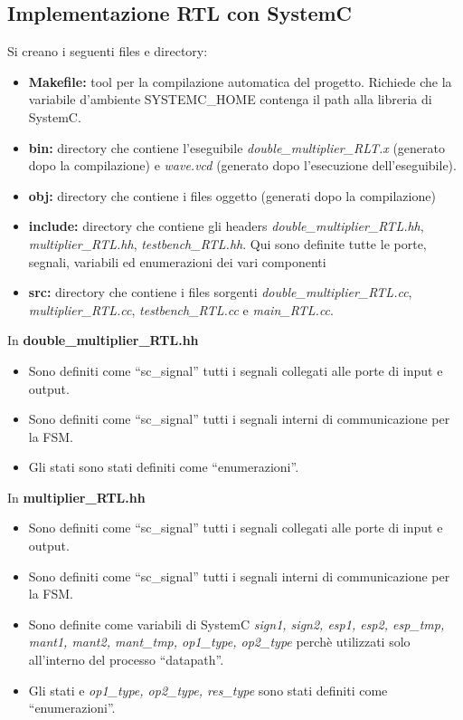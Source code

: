 \documentclass[]{IEEEtran}
\begin{document}
\subsection{Implementazione RTL con SystemC \label{section:SystemC}}
Si creano i seguenti files e directory:
\begin{itemize}
    \item \textbf{Makefile:} tool per la compilazione automatica del progetto. Richiede che la variabile d'ambiente SYSTEMC\_HOME contenga il path alla libreria di SystemC.
    \item \textbf{bin:} directory che contiene l'eseguibile \textit{double\_multiplier\_RLT.x} (generato dopo la compilazione) e \textit{wave.vcd} (generato dopo l'esecuzione dell'eseguibile).
    \item \textbf{obj:} directory che contiene i files oggetto (generati dopo la compilazione)
    \item \textbf{include:} directory che contiene gli headers \textit{double\_multiplier\_RTL.hh}, \textit{multiplier\_RTL.hh}, \textit{testbench\_RTL.hh}. Qui sono definite tutte le porte, segnali, variabili ed enumerazioni dei vari componenti
    \item \textbf{src:} directory che contiene i files sorgenti \textit{double\_multiplier\_RTL.cc}, \textit{multiplier\_RTL.cc}, \textit{testbench\_RTL.cc} e \textit{main\_RTL.cc}.
\end{itemize}
In \textbf{double\_multiplier\_RTL.hh}
\begin{itemize}
    \item Sono definiti come ``sc\_signal'' tutti i segnali collegati alle porte di input e output.
    \item Sono definiti come ``sc\_signal'' tutti i segnali interni di communicazione per la FSM.
    \item Gli stati sono stati definiti come ``enumerazioni''.
\end{itemize}
In \textbf{multiplier\_RTL.hh}
\begin{itemize}
    \item Sono definiti come ``sc\_signal'' tutti i segnali collegati alle porte di input e output.
    \item Sono definiti come ``sc\_signal'' tutti i segnali interni di communicazione per la FSM.
    \item Sono definite come variabili di SystemC \textit{sign1, sign2, esp1, esp2, esp\_tmp, mant1, mant2, mant\_tmp, op1\_type, op2\_type} perchè utilizzati solo all'interno del processo ``datapath''.
    \item Gli stati e \textit{op1\_type, op2\_type, res\_type} sono stati definiti come ``enumerazioni''.
\end{itemize}
\end{document}
